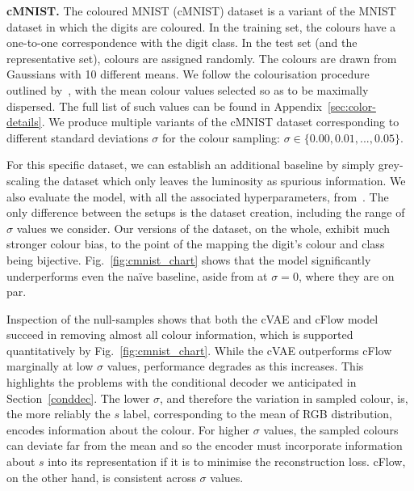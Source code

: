 \textbf{cMNIST.}\label{ssec:cmnist}
The coloured MNIST (cMNIST) dataset is a variant of the MNIST dataset in which the digits are coloured.
In the training set, the colours have a one-to-one correspondence with the digit class.
In the test set (and the representative set), colours are assigned randomly.
The colours are drawn from Gaussians with 10 different means.
We follow the colourisation procedure outlined by~\cite{ln2l}, with the mean colour values selected so as to be maximally dispersed.
The full list of such values can be found in Appendix~\ref{sec:color-details}.
We produce multiple variants of the cMNIST dataset corresponding to different standard deviations $\sigma$ for the colour sampling:
$\sigma \in \{0.00, 0.01, ..., 0.05 \}$.

For this specific dataset, we can establish an additional baseline by simply grey-scaling the dataset
which only leaves the luminosity as spurious information.
We also evaluate the model, with all the associated hyperparameters, from~\cite{ln2l}.
The only difference between the setups is the dataset creation, including the range of $\sigma$ values we consider.
Our versions of the dataset, on the whole, exhibit much stronger colour bias, to the point of the mapping the digit's colour and class being bijective.
Fig.~\ref{fig:cmnist_chart} shows that the model significantly underperforms even the na\"ive baseline, aside from at $\sigma = 0$, where they are on par.

Inspection of the null-samples shows that both the cVAE and cFlow model succeed in removing almost all colour information, which is supported quantitatively by Fig.~\ref{fig:cmnist_chart}.
While the cVAE outperforms cFlow marginally at low $\sigma$ values, performance degrades
as this increases.
This highlights the problems with the conditional decoder we anticipated in Section~\ref{conddec}.
The lower $\sigma$, and therefore the variation in sampled colour, is, the more reliably the $s$ label, corresponding to the mean of RGB distribution, encodes information about the colour.
For higher $\sigma$ values, the sampled colours can deviate far from the mean and so the encoder must incorporate information about $s$ into its representation if it is to minimise the reconstruction loss.
cFlow, on the other hand, is consistent across $\sigma$ values.


